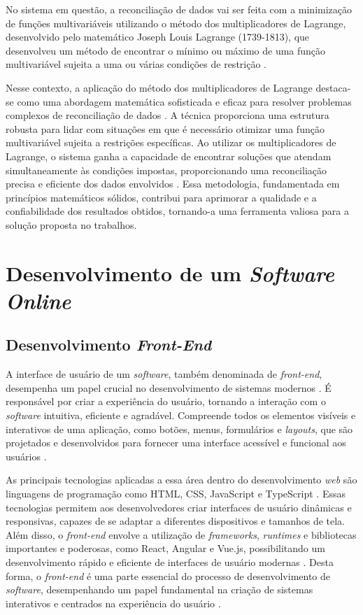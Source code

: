 No sistema em questão, a reconciliação de dados vai ser feita com a minimização de funções multivariáveis utilizando o método dos multiplicadores de Lagrange, desenvolvido pelo matemático Joseph Louis Lagrange (1739-1813), que desenvolveu um método de encontrar o mínimo ou máximo de uma função multivariável sujeita a uma ou várias condições de restrição \cite{lagrangebio}.
    
Nesse contexto, a aplicação do método dos multiplicadores de Lagrange destaca-se como uma abordagem matemática sofisticada e eficaz para resolver problemas complexos de reconciliação de dados \cite{optimizationlagrange}. A técnica proporciona uma estrutura robusta para lidar com situações em que é necessário otimizar uma função multivariável sujeita a restrições específicas. Ao utilizar os multiplicadores de Lagrange, o sistema ganha a capacidade de encontrar soluções que atendam simultaneamente às condições impostas, proporcionando uma reconciliação precisa e eficiente dos dados envolvidos \cite{aularecon}. Essa metodologia, fundamentada em princípios matemáticos sólidos, contribui para aprimorar a qualidade e a confiabilidade dos resultados obtidos, tornando-a uma ferramenta valiosa para a solução proposta no trabalhos.
        
\section{Desenvolvimento de um \textit{Software Online}}
\subsection{Desenvolvimento \textit{Front-End}}
    
A interface de usuário de um \textit{software}, também denominada de \textit{front-end}, desempenha um papel crucial no desenvolvimento de sistemas modernos \cite{eloquentjavascript}. É responsável por criar a experiência do usuário, tornando a interação com o \textit{software} intuitiva, eficiente e agradável. Compreende todos os elementos visíveis e interativos de uma aplicação, como botões, menus, formulários e \textit{layouts}, que são projetados e desenvolvidos para fornecer uma interface acessível e funcional aos usuários \cite{frontendperfomance}.
    
As principais tecnologias aplicadas a essa área dentro do desenvolvimento \textit{web} são linguagens de programação como HTML, CSS, JavaScript e TypeScript \cite{webdevlang}. Essas tecnologias permitem aos desenvolvedores criar interfaces de usuário dinâmicas e responsivas, capazes de se adaptar a diferentes dispositivos e tamanhos de tela. Além disso, o \textit{front-end} envolve a utilização de \textit{frameworks}, \textit{runtimes} e bibliotecas importantes e poderosas, como React, Angular e Vue.js, possibilitando um desenvolvimento rápido e eficiente de interfaces de usuário modernas \cite{frontendperfomance}. Desta forma, o \textit{front-end} é uma parte essencial do processo de desenvolvimento de \textit{software}, desempenhando um papel fundamental na criação de sistemas interativos e centrados na experiência do usuário \cite{reactjs}.


